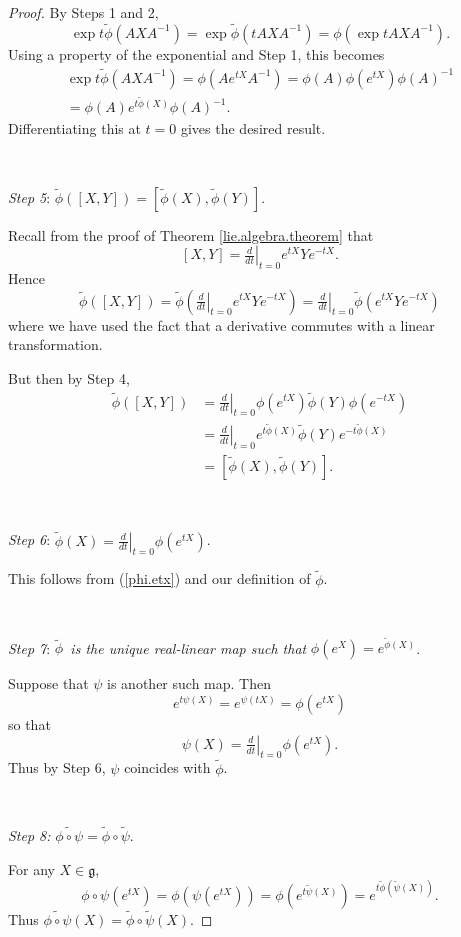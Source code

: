 \documentclass{amsbook}
\let \frak = \mathfrak
\theoremstyle{plain}
\numberwithin{equation}{chapter}
\numberwithin{theorem}{chapter}
\begin{document}
\begin{proof}
By Steps 1 and 2,
\[
\exp t\widetilde{\phi}(AXA^{-1})=\exp\widetilde{\phi}(tAXA^{-1})=\phi\left(
\exp tAXA^{-1}\right)  \text{.}%
\]
Using a property of the exponential and Step 1, this becomes
\begin{align*}
\exp t\widetilde{\phi}(AXA^{-1})=\phi\left(  Ae^{tX}A^{-1}\right)
=\phi(A)\phi(e^{tX})\phi(A)^{-1}\\
=\phi(A)e^{t\widetilde{\phi}(X)}\phi(A)^{-1}\text{.}%
\end{align*}
Differentiating this at $t=0$ gives the desired result.

\ \ 

\textit{Step 5}: $\widetilde{\phi}(\left[  X,Y\right]  )=\left[
\widetilde{\phi}(X),\widetilde{\phi}(Y)\right]  $.

Recall from the proof of Theorem \ref{lie.algebra.theorem} that
\[
\left[  X,Y\right]  =\left.  \tfrac{d}{dt}\right|  _{t=0}e^{tX}Ye^{-tX}%
\text{.}%
\]
Hence
\[
\widetilde{\phi}\left(  \left[  X,Y\right]  \right)  =\widetilde{\phi}\left(
\left.  \tfrac{d}{dt}\right|  _{t=0}e^{tX}Ye^{-tX}\right)  =\left.  \tfrac
{d}{dt}\right|  _{t=0}\widetilde{\phi}\left(  e^{tX}Ye^{-tX}\right)
\]
where we have used the fact that a derivative commutes with a linear transformation.

But then by Step 4,
\begin{align*}
\widetilde{\phi}\left(  \left[  X,Y\right]  \right)    & =\left.  \tfrac
{d}{dt}\right|  _{t=0}\phi(e^{tX})\widetilde{\phi}(Y)\phi(e^{-tX})\\
& =\left.  \tfrac{d}{dt}\right|  _{t=0}e^{t\widetilde{\phi}(X)}\widetilde
{\phi}(Y)e^{-t\widetilde{\phi}(X)}\\
& =\left[  \widetilde{\phi}(X),\widetilde{\phi}(Y)\right]  \text{.}%
\end{align*}

\ 

\textit{Step 6}: $\widetilde{\phi}(X)=\left.  \tfrac{d}{dt}\right|  _{t=0}%
\phi(e^{tX})$.

This follows from (\ref{phi.etx}) and our definition of $\widetilde{\phi}$.

\ 

\textit{Step 7}: $\widetilde{\phi}$\textit{\ is the unique real-linear map
such that }$\phi(e^{X})=e^{\widetilde{\phi}(X)}$.

Suppose that $\psi$ is another such map. Then
\[
e^{t\psi(X)}=e^{\psi(tX)}=\phi(e^{tX})
\]
so that
\[
\psi(X)=\left.  \tfrac{d}{dt}\right|  _{t=0}\phi(e^{tX})\text{.}%
\]
Thus by Step 6, $\psi$ coincides with $\widetilde{\phi}$.

\ 

\textit{Step 8: }$\widetilde{\phi\circ\psi}=\widetilde{\phi}\circ
\widetilde{\psi}$.

For any $X\in\frak{g}$,
\[
\phi\circ\psi\left(  e^{tX}\right)  =\phi\left(  \psi\left(  e^{tX}\right)
\right)  =\phi\left(  e^{t\widetilde{\psi}(X)}\right)  =e^{t\widetilde{\phi
}(\widetilde{\psi}(X))}\text{.}%
\]
Thus $\widetilde{\phi\circ\psi}(X)=\widetilde{\phi}\circ\widetilde{\psi}(X)$.
\end{proof}
\end{document}
